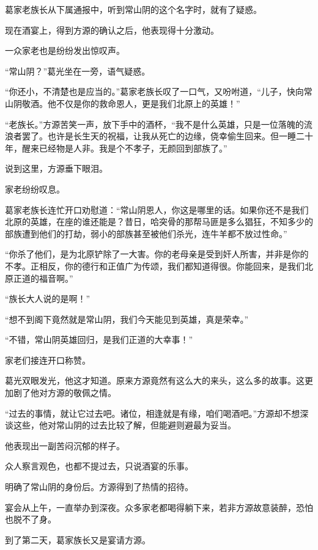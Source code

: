 
\begin{this_body}

葛家老族长从下属通报中，听到常山阴的这个名字时，就有了疑惑。

现在酒宴上，得到方源的确认之后，他表现得十分激动。

一众家老也是纷纷发出惊叹声。

“常山阴？”葛光坐在一旁，语气疑惑。

“你还小，不清楚也是应当的。”葛家老族长叹了一口气，又吩咐道，“儿子，快向常山阴敬酒。他不仅是你的救命恩人，更是我们北原上的英雄！”

“老族长。”方源苦笑一声，放下手中的酒杯，“我不是什么英雄，只是一位落魄的流浪者罢了。也许是长生天的祝福，让我从死亡的边缘，侥幸偷生回来。但一睡二十年，醒来已经物是人非。我是个不孝子，无颜回到部族了。”

说到这里，方源垂下眼泪。

家老纷纷叹息。

葛家老族长连忙开口劝慰道：“常山阴恩人，你这是哪里的话。如果你还不是我们北原的英雄，在座的谁还能是？昔日，哈突骨的那帮马匪是多么猖狂，不知多少的部族遭到他们的打劫，弱小的部族甚至被他们杀光，连牛羊都不放过性命。”

“你杀了他们，是为北原铲除了一大害。你的老母亲是受到奸人所害，并非是你的不孝。正相反，你的德行和正值广为传颂，我们都知道得很。你能回来，是我们北原正道的福音啊。”

“族长大人说的是啊！”

“想不到阁下竟然就是常山阴，我们今天能见到英雄，真是荣幸。”

“不错，常山阴英雄回归，是我们正道的大幸事！”

家老们接连开口称赞。

葛光双眼发光，他这才知道。原来方源竟然有这么大的来头，这么多的故事。这更加剧了他对方源的敬佩之情。

“过去的事情，就让它过去吧。诸位，相逢就是有缘，咱们喝酒吧。”方源却不想深谈这些，他对常山阴的过去比较了解，但能避则避最为妥当。

他表现出一副苦闷沉郁的样子。

众人察言观色，也都不提过去，只说酒宴的乐事。

明确了常山阴的身份后。方源得到了热情的招待。

宴会从上午，一直举办到深夜。众多家老都喝得躺下来，若非方源故意装醉，恐怕也脱不了身。

到了第二天，葛家族长又是宴请方源。


\end{this_body}
